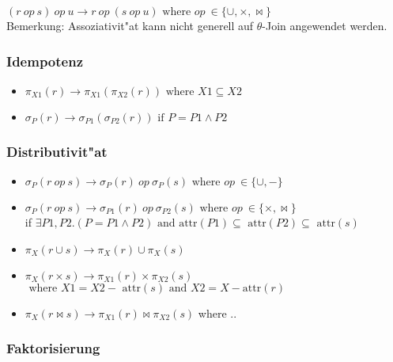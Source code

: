 \documentclass[german, 10pt, a4paper, twocolumn]{scrartcl}
\theoremstyle{definition}
\theoremstyle{remark}
\theoremstyle{example}
\begin{document}
$(r \ op \ s) \ op \ u \rightarrow r \ op \ (s \ op \ u) \mbox{ where } op \ \in \{ \cup, \times, \bowtie \}$\\

Bemerkung: Assoziativit"at kann nicht generell auf $\theta$-Join angewendet werden.

\subsubsection{Idempotenz}

\begin{itemize}
	\item $\pi_{X1}(r) \rightarrow \pi_{X1}(\pi_{X2}(r)) \mbox{ where } X1 \subseteq X2$
	\item $\sigma_P(r) \rightarrow \sigma_{P1}(\sigma_{P2}(r)) \mbox{ if } P=P1 \land P2$
\end{itemize}

\subsubsection{Distributivit"at}

\begin{itemize}
	\item $\sigma_P(r\ op\ s) \rightarrow \sigma_P(r) \ op \ \sigma_P(s) \mbox{ where } op \ \in \{ \cup, -\}$
	\item $\sigma_P(r\ op\ s) \rightarrow \sigma_{P1}(r) \ op \ \sigma_{P2}(s) \mbox{ where } op \ \in \{ \times, \bowtie \}$\\
		if $\exists P1, P2 . (P = P1 \land P2) \mbox{ and attr}(P1) \subseteq \mbox{ attr}(P2) \subseteq \mbox{ attr}(s)$
	\item $\pi_X(r \cup s) \rightarrow \pi_X (r) \cup \pi_X (s)$
	\item $\pi_X (r \times s) \rightarrow \pi_{X1}(r) \times \pi_{X2}(s)$\\
		$\mbox{ where } X1=X2-\mbox{ attr}(s) \mbox{ and }X2=X-\mbox{attr}(r)$
	\item $\pi_X (r \bowtie s) \rightarrow \pi_{X1} (r) \bowtie \pi_{X2} (s)$ where ..
\end{itemize}

\subsubsection{Faktorisierung}
\end{document}
